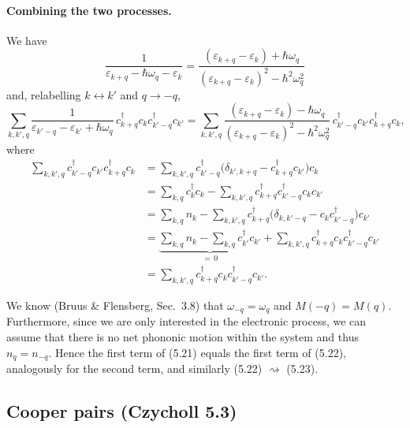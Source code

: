 \documentclass[../../main.tex]{subfiles}
\begin{document}
\paragraph{Combining the two processes.}
We have
\begin{equation}
\frac{1}{\varepsilon_{k+q}-\hbar\omega_q-\varepsilon_k}
=\frac{(\varepsilon_{k+q}-\varepsilon_k)+\hbar\omega_q}
      {(\varepsilon_{k+q}-\varepsilon_k)^2-\hbar^2\omega_q^2}
\end{equation}
and, relabelling $k\leftrightarrow k'$ and $q\to-q$,
\begin{equation}
\sum_{k,k',q}\frac{1}{\varepsilon_{k'-q}-\varepsilon_{k'}+\hbar\omega_q}\,
c^\dagger_{k+q}c_k c^\dagger_{k'-q}c_{k'}
=\sum_{k,k',q}\frac{(\varepsilon_{k+q}-\varepsilon_k)-\hbar\omega_q}
      {(\varepsilon_{k+q}-\varepsilon_k)^2-\hbar^2\omega_q^2}\,
c^\dagger_{k'-q}c_{k'}c^\dagger_{k+q}c_k ,
\end{equation}
where
\begin{align}
\sum_{k,k',q}c^\dagger_{k'-q}c_{k'}c^\dagger_{k+q}c_k
&=\sum_{k,k',q}c^\dagger_{k'-q}\big(\delta_{k',k+q}-c^\dagger_{k+q}c_{k'}\big)c_k\\
&=\sum_{k,q}c^\dagger_k c_k-\sum_{k,k',q}c^\dagger_{k+q}c^\dagger_{k'-q}c_k c_{k'}\\
&=\sum_{k,q}n_k-\sum_{k,k',q}c^\dagger_{k+q}
   \big(\delta_{k,k'-q}-c_k c^\dagger_{k'-q}\big)c_{k'}\\
&=\underbrace{\sum_{k,q}n_k-\sum_{k,q}c^\dagger_{k'}c_{k'}}_{=\,0}
  +\sum_{k,k',q}c^\dagger_{k+q}c_k c^\dagger_{k'-q}c_{k'}\\
&=\sum_{k,k',q}c^\dagger_{k+q}c_k c^\dagger_{k'-q}c_{k'} .
\end{align}

We know (Bruus \& Flensberg, Sec.~3.8) that $\omega_{-q}=\omega_q$ and $M(-q)=M(q)$.
Furthermore, since we are only interested in the electronic process, we can assume that
there is no net phononic motion within the system and thus $n_q=n_{-q}$.
Hence the first term of (5.21) equals the first term of (5.22), analogously for the
second term, and similarly (5.22) $\rightsquigarrow$ (5.23).

\subsection{Cooper pairs (Czycholl 5.3)}
\label{sec:bcs-cooper-pairs_details}
\end{document}
